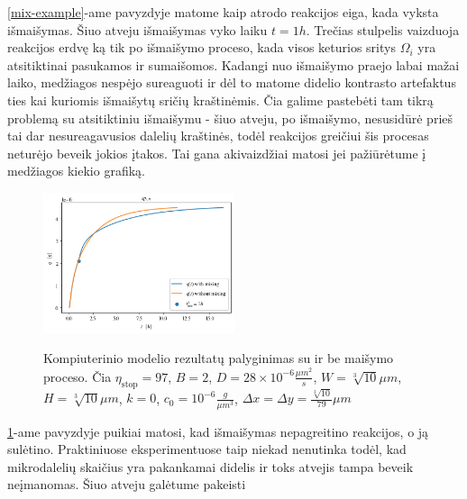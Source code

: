 \ref{mix-example}-ame pavyzdyje matome kaip atrodo reakcijos eiga, kada vyksta išmaišymas. Šiuo atveju išmaišymas vyko laiku $t=1h$. Trečias stulpelis vaizduoja reakcijos erdvę ką tik po išmaišymo proceso, kada visos keturios sritys $\Omega_i$ yra atsitiktinai pasukamos ir sumaišomos. Kadangi nuo išmaišymo praejo labai mažai laiko, medžiagos nespėjo sureaguoti ir dėl to matome didelio kontrasto artefaktus ties kai kuriomis išmaišytų sričių kraštinėmis. Čia galime pastebėti tam tikrą problemą su atsitiktiniu išmaišymu - šiuo atveju, po išmaišymo, nesusidūrė prieš tai dar nesureagavusios dalelių kraštinės, todėl reakcijos greičiui šis procesas neturėjo beveik jokios įtakos. Tai gana akivaizdžiai matosi jei pažiūrėtume į medžiagos kiekio grafiką.

\newpage

\begin{figure}[h!]
    \centering
    \caption{Kompiuterinio modelio rezultatų palyginimas su ir be maišymo proceso. Čia $\eta_\text{stop} = 97$, $B = 2$, $D = 28\times 10^{-6} \frac{\mu m^2}{s}$, $W = \sqrt[3]{10}\mu m$, $H = \sqrt[3]{10}\mu m$, $k = 0$, $c_0 = 10^{-6} \frac{g}{\mu m^3}$, $\Delta x = \Delta y = \frac{\sqrt[3]{10}}{79} \mu m$ }
    \includegraphics[width=0.5\textwidth]{../paper/assets/bad-mix-qnt-compare.png}
    \label{bad-mix-qnt-example}
\end{figure}

\ref{bad-mix-qnt-example}-ame pavyzdyje puikiai matosi, kad išmaišymas nepagreitino reakcijos, o ją sulėtino. Praktiniuose eksperimentuose taip niekad nenutinka todėl, kad mikrodalelių skaičius yra pakankamai didelis ir toks atvejis tampa beveik neįmanomas. Šiuo atveju galėtume pakeisti 


